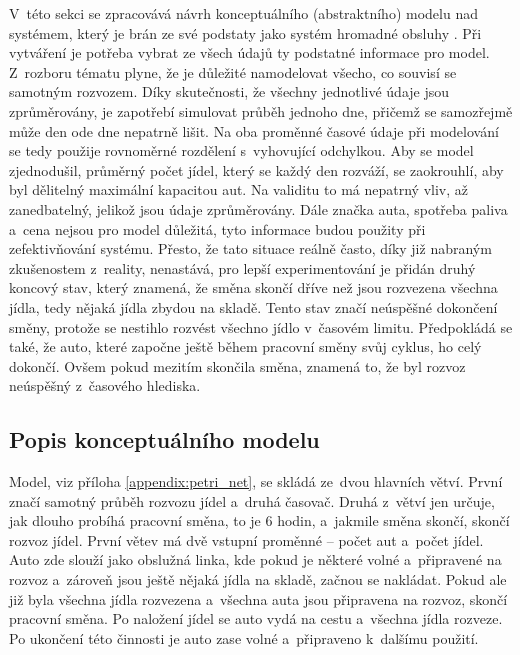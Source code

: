 \documentclass[a4paper, 11pt]{article}
\begin{document}
	V~této sekci se zpracovává návrh konceptuálního (abstraktního) modelu
	\cite[snímek 48]{IMS_slides} nad systémem, který je brán ze své podstaty
	jako systém hromadné obsluhy \cite[snímek 136]{IMS_slides}. Při vytváření
	je potřeba vybrat ze všech údajů ty podstatné informace pro model.
	Z~rozboru tématu plyne, že je důležité namodelovat všecho, co souvisí se
	samotným rozvozem. Díky skutečnosti, že všechny jednotlivé údaje jsou
	zprůměrovány, je zapotřebí simulovat průběh jednoho dne, přičemž se
	samozřejmě může den ode dne nepatrně lišit.	Na oba proměnné časové údaje
	při modelování se tedy použije rovnoměrné rozdělení
	\cite[snímek 89]{IMS_slides} s~vyhovující odchylkou. Aby se model
	zjednodušil, průměrný počet jídel, který se každý den rozváží, se
	zaokrouhlí, aby byl dělitelný maximální kapacitou aut. Na validitu to má
	nepatrný vliv, až zanedbatelný, jelikož jsou údaje zprůměrovány. Dále
	značka auta, spotřeba paliva a~cena nejsou pro model důležitá, tyto
	informace budou použity při zefektivňování systému. Přesto, že tato
	situace reálně často, díky již nabraným zkušenostem z~reality, nenastává,
	pro lepší experimentování je přidán druhý koncový stav, který znamená,
	že směna skončí dříve než jsou rozvezena všechna jídla, tedy nějaká
	jídla zbydou na skladě. Tento stav značí neúspěšné dokončení směny,
	protože se nestihlo rozvést všechno jídlo v~časovém limitu. Předpokládá se
	také, že auto, které započne ještě během pracovní směny svůj cyklus, ho
	celý dokončí. Ovšem pokud mezitím skončila směna, znamená to, že byl
	rozvoz neúspěšný z~časového hlediska.


	\subsection{Popis konceptuálního modelu}
	\label{section:conceptual_model_desc}

	Model, viz příloha \ref{appendix:petri_net}, se skládá ze~dvou hlavních
	větví. První značí samotný průběh rozvozu jídel a~druhá časovač. Druhá
	z~větví jen určuje, jak dlouho probíhá pracovní směna, to je 6 hodin,
	a~jakmile směna skončí, skončí rozvoz jídel. První větev má dvě vstupní
	proměnné -- počet aut a~počet jídel. Auto zde slouží jako obslužná linka,
	kde pokud je některé volné a~připravené na rozvoz a~zároveň jsou ještě
	nějaká jídla na skladě, začnou se nakládat. Pokud ale již byla všechna
	jídla rozvezena a~všechna auta jsou připravena na rozvoz, skončí pracovní
	směna. Po naložení jídel se auto vydá na cestu a~všechna jídla rozveze.
	Po ukončení této činnosti je auto zase volné a~připraveno k~dalšímu použití.
\end{document}

